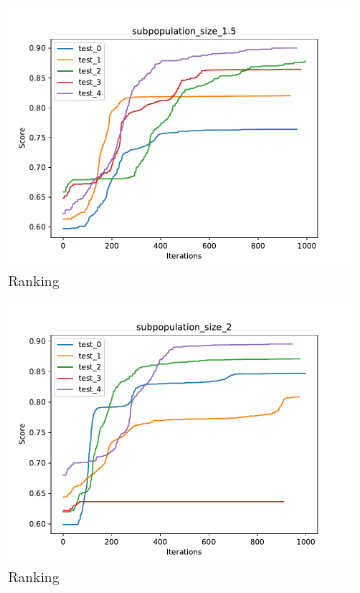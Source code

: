 \begin{figure}[H]
\begin{subfigure}[b]{0.49\linewidth}
        \includegraphics[width=\linewidth]{img/subpopulation_size_1.5.pdf}
        \caption{Ranking}
    \end{subfigure}
    \begin{subfigure}[b]{0.49\linewidth}
        \includegraphics[width=\linewidth]{img/subpopulation_size_2.pdf}
        \caption{Ranking}
    \end{subfigure}
    \begin{subfigure}[b]{0.49\linewidth}

\end{subfigure}
\end{figure}
